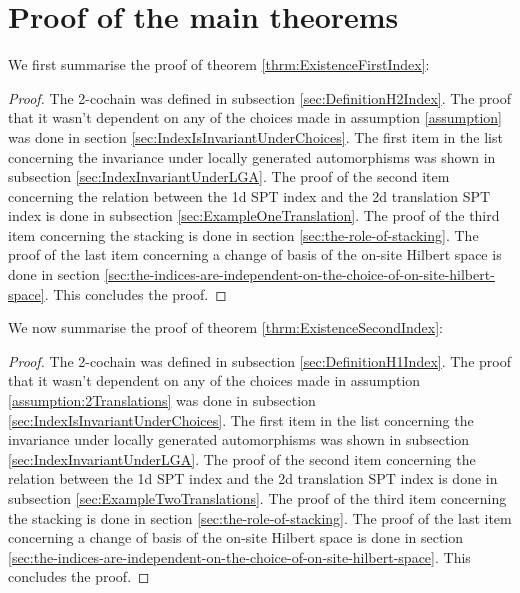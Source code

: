 \section{Proof of the main theorems}\label{sec:ProofOfMainTheorems}
We first summarise the proof of theorem \ref{thrm:ExistenceFirstIndex}:
\begin{proof}
	The 2-cochain was defined in subsection \ref{sec:DefinitionH2Index}. The proof that it wasn't dependent on any of the choices made in assumption \ref{assumption} was done in section \ref{sec:IndexIsInvariantUnderChoices}. The first item in the list concerning the invariance under locally generated automorphisms was shown in subsection \ref{sec:IndexInvariantUnderLGA}. The proof of the second item concerning the relation between the 1d SPT index and the 2d translation SPT index is done in subsection \ref{sec:ExampleOneTranslation}. The proof of the third item concerning the stacking is done in section \ref{sec:the-role-of-stacking}. The proof of the last item concerning a change of basis of the on-site Hilbert space is done in section \ref{sec:the-indices-are-independent-on-the-choice-of-on-site-hilbert-space}. This concludes the proof.
\end{proof}
We now summarise the proof of theorem \ref{thrm:ExistenceSecondIndex}:
\begin{proof}
	The 2-cochain was defined in subsection \ref{sec:DefinitionH1Index}. The proof that it wasn't dependent on any of the choices made in assumption \ref{assumption:2Translations} was done in subsection \ref{sec:IndexIsInvariantUnderChoices}. The first item in the list concerning the invariance under locally generated automorphisms was shown in subsection \ref{sec:IndexInvariantUnderLGA}. The proof of the second item concerning the relation between the 1d SPT index and the 2d translation SPT index is done in subsection \ref{sec:ExampleTwoTranslations}. The proof of the third item concerning the stacking is done in section \ref{sec:the-role-of-stacking}. The proof of the last item concerning a change of basis of the on-site Hilbert space is done in section \ref{sec:the-indices-are-independent-on-the-choice-of-on-site-hilbert-space}. This concludes the proof.
\end{proof}
